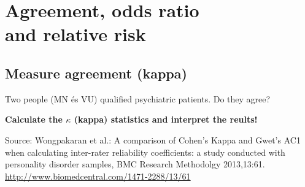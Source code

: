\chapter[Agreement, odds ratio and relative risk]{Agreement, odds ratio\\ and relative risk}


\section{Measure agreement (kappa)}
Two people (MN és VU) qualified psychiatric patients. Do  they agree? 

\noindent\textbf{Calculate the $\kappa$ (kappa)  statistics and interpret the reults!}

\begin{flushright}
\small Source:
Wongpakaran et al.: A comparison of Cohen’s Kappa and Gwet’s AC1 when calculating inter-rater reliability coefficients: a study conducted with personality disorder samples,  BMC Research Methodolgy 2013,13:61. \\
\url{http://www.biomedcentral.com/1471-2288/13/61}
\end{flushright}




